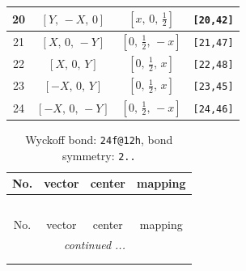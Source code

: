 \documentclass[fleqn,8pt]{jsarticle}
\begin{document}
\begin{longtable}{cccc}
20 & $\left[ Y,\, - X,\, 0 \right]$ & $\left[ x,\, 0,\, \frac{1}{2} \right]$ & {\tt [20,42]} \\ \hline
21 & $\left[ X,\, 0,\, - Y \right]$ & $\left[ 0,\, \frac{1}{2},\, - x \right]$ & {\tt [21,47]} \\ \hline
22 & $\left[ X,\, 0,\, Y \right]$ & $\left[ 0,\, \frac{1}{2},\, x \right]$ & {\tt [22,48]} \\ \hline
23 & $\left[ - X,\, 0,\, Y \right]$ & $\left[ 0,\, \frac{1}{2},\, x \right]$ & {\tt [23,45]} \\ \hline
24 & $\left[ - X,\, 0,\, - Y \right]$ & $\left[ 0,\, \frac{1}{2},\, - x \right]$ & {\tt [24,46]} \\
\end{longtable}
\renewcommand{\arraystretch}{1.2}
\begin{longtable}{cccc}
\caption{Wyckoff bond: {\tt 24f@12h}, bond symmetry: {\tt 2..}}
 \\
 \hline \hline
No. & vector & center & mapping \\ \hline \endfirsthead

\multicolumn{3}{l}{\tablename\ \thetable{}} \\
 \hline \hline
No. & vector & center & mapping \\ \hline \endhead

 \hline \hline
\multicolumn{3}{r}{\footnotesize\it continued ...} \\ \endfoot

 \hline \hline
\multicolumn{3}{r}{} \\ \endlastfoot


\end{longtable}
\end{document}
